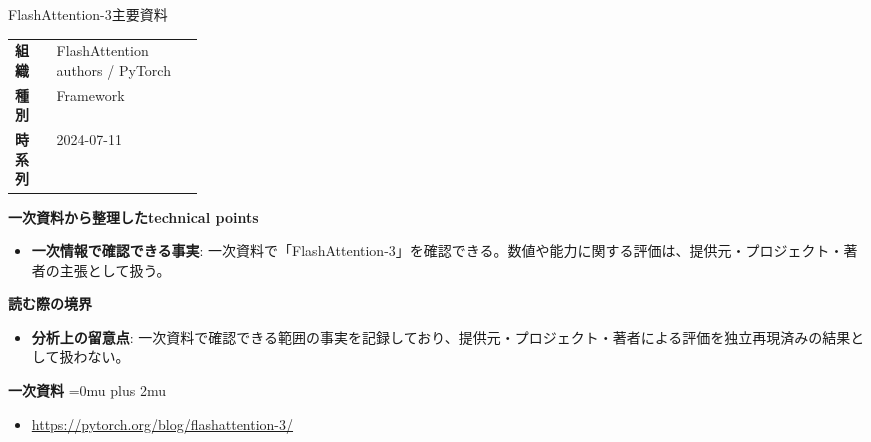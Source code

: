 \begin{technicalnote}{FlashAttention-3}{主要資料}
\begingroup
\begin{tabularx}{\linewidth}{@{}>{\bfseries}p{0.22\linewidth}X@{}}
組織 & FlashAttention authors / PyTorch \\
種別 & Framework \\
時系列 & 2024-07-11 \\
\end{tabularx}
\smallskip
{\bfseries 一次資料から整理したtechnical points}
\begin{itemize}[leftmargin=1.5em,itemsep=0.35em]
\item \textbf{一次情報で確認できる事実}: 一次資料で「FlashAttention-3」を確認できる。数値や能力に関する評価は、提供元・プロジェクト・著者の主張として扱う。
\end{itemize}
\begin{minipage}{\linewidth}
{\bfseries 読む際の境界}
\begin{itemize}[leftmargin=1.5em,itemsep=0.35em]
\item \textbf{分析上の留意点}: 一次資料で確認できる範囲の事実を記録しており、提供元・プロジェクト・著者による評価を独立再現済みの結果として扱わない。
\end{itemize}
\begin{samepage}
{\bfseries 一次資料}
\begingroup\sloppy
\Urlmuskip=0mu plus 2mu\relax
\begin{itemize}[leftmargin=1.5em,itemsep=0.25em]
\item {\scriptsize\url{https://pytorch.org/blog/flashattention-3/}}
\end{itemize}
\endgroup
\end{samepage}
\end{minipage}
\endgroup
\end{technicalnote}
\medskip

